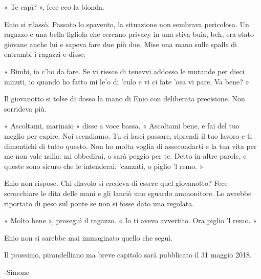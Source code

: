 « Te capì? », fece eco la bionda.

Enio si rilassò. Passato lo spavento, la situazione non sembrava pericolosa. Un ragazzo e una bella figliola che cercano privacy in una stiva buia, beh, era stato giovane anche lui e sapeva fare due più due. Mise una mano sulle spalle di entrambi i ragazzi e disse:

« Bimbi, io c'ho da fare. Se vi riesce di tenevvi addosso le mutande per dieci minuti, io quando ho fatto mi le'o di 'culo e vi ci fate 'osa vi pare. Va bene? »

Il giovanotto si tolse di dosso la mano di Enio con deliberata precisione. Non sorrideva più.

« Ascoltami, marinaio » disse a voce bassa. « Ascoltami bene, e fai del tuo meglio per capire. Noi scendiamo. Tu ci lasci passare, riprendi il tuo lavoro e ti dimentichi di tutto questo. Non ho molta voglia di assecondarti e la tua vita per me non vale nulla: mi obbedirai, o sarà peggio per te. Detto in altre parole, e queste sono sicuro che le intenderai: 'canzati, o piglio 'l remo. »

Enio non rispose. Chi diavolo si credeva di essere quel giovanotto? Fece scrocchiare le dita delle mani e gli lanciò uno sguardo ammonitore. Lo avrebbe riportato di peso sul ponte se non si fosse dato una regolata.

« Molto bene », proseguì il ragazzo. « Io ti avevo avvertito. Ora piglio 'l remo. »

Enio non si sarebbe mai immaginato quello che seguì.

Il prossimo, pirandelliano ma breve capitolo sarà pubblicato il 31 maggio 2018.

-Simone



